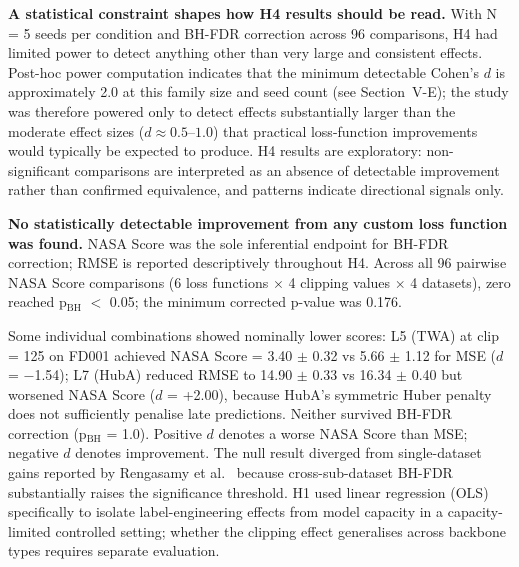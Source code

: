 \documentclass[review,12pt]{elsarticle}
\begin{document}
\textbf{A statistical constraint shapes how H4 results should be read.} With N = 5 seeds per condition and BH-FDR correction across 96 comparisons, H4 had limited power to detect anything other than very large and consistent effects. Post-hoc power computation indicates that the minimum detectable Cohen's $d$ is approximately 2.0 at this family size and seed count (see Section~V-E); the study was therefore powered only to detect effects substantially larger than the moderate effect sizes ($d \approx 0.5$--$1.0$) that practical loss-function improvements would typically be expected to produce. H4 results are exploratory: non-significant comparisons are interpreted as an absence of detectable improvement rather than confirmed equivalence, and patterns indicate directional signals only.

\textbf{No statistically detectable improvement from any custom loss function was found.} NASA Score was the sole inferential endpoint for BH-FDR correction; RMSE is reported descriptively throughout H4. Across all 96 pairwise NASA Score comparisons (6 loss functions $\times$ 4 clipping values $\times$ 4 datasets), zero reached p$_\text{BH}$ $<$ 0.05; the minimum corrected p-value was 0.176.

Some individual combinations showed nominally lower scores: L5 (TWA) at clip = 125 on FD001 achieved NASA Score = 3.40 $\pm$ 0.32 vs 5.66 $\pm$ 1.12 for MSE ($d$ = $-$1.54); L7 (HubA) reduced RMSE to 14.90 $\pm$ 0.33 vs 16.34 $\pm$ 0.40 but worsened NASA Score ($d$ = +2.00), because HubA's symmetric Huber penalty does not sufficiently penalise late predictions. Neither survived BH-FDR correction (p$_\text{BH}$ = 1.0). Positive $d$ denotes a worse NASA Score than MSE; negative $d$ denotes improvement. The null result diverged from single-dataset gains reported by Rengasamy et al.\ \cite{ref37,ref39} because cross-sub-dataset BH-FDR substantially raises the significance threshold. H1 used linear regression (OLS) specifically to isolate label-engineering effects from model capacity in a capacity-limited controlled setting; whether the clipping effect generalises across backbone types requires separate evaluation.
\end{document}
